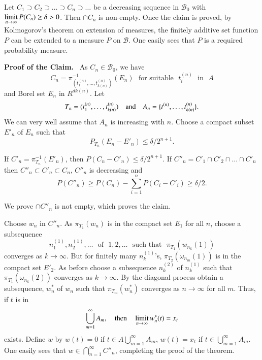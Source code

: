 \begin{claim*}
Let $C_{1}\supset C_{2}\supset \ldots \supset C_{n}\supset \ldots$ be
a decreasing sequence in $\mathscr{B}_{0}$ with $\operatorname*{limit}\limits_{n\to
  \infty}P(C_{n})\geq \delta>0$. Then $\cap C_{n}$ is non-empty. Once
the claim is proved, by Kolmogorov's theorem on extension of measures,
the finitely additive set function $P$ can be extended to a measure
$P$ on $\mathscr{B}$. One easily sees that $P$ is a required
probability measure.
\end{claim*}


\noindent
{\bf Proof of the Claim.}~ As $C_{n}\in \mathscr{B}_{0}$, we have 
$$
C_{n}=\pi^{-1}_{(t^{(n)}_{1},\ldots,t^{(n)}_{k(n)})}(E_{n})\text{~ for
  suitable~ } t^{(n)}_{i}\text{~ in~ } A
$$
and Borel set $E_{n}$ in $R^{dk(n)}$. Let
$$
T_{n}=(t^{(n)}_{1},\ldots,t^{(n)}_{k(n)})\quad\text{and}\quad
A_{n}=\{t^{(n)},\ldots,t^{(n)}_{k(n)}\}. 
$$
We can very well assume
that $A_{n}$ is increasing with\pageoriginale 
$n$. Choose a compact subset $E'_{n}$ of
$E_{n}$ such that 
$$
P_{T_{n}}(E_{n}-E'_{n})\leq \delta/2^{n+1}.
$$

If $C'_{n}=\pi^{-1}_{T_{n}}(E'_{n})$, then $P(C_{n}-C'_{n})\leq
\delta/2^{n+1}$. If $C''_{n}=C'_{1}\cap C'_{2}\cap \ldots\cap C'_{n}$
then $C''_{n}\subset C'_{n}\subset C_{n}$, $C''_{n}$ is decreasing and 
$$
P(C''_{n})\geq P(C_{n})-\sum\limits^{n}_{i=1}P(C_{i}-C'_{i})\geq \delta/2.
$$

We prove $\cap C''_{n}$ is not empty, which proves the claim.

Choose $w_{n}$ in $C''_{n}$. As $\pi_{T_{1}}(w_{n})$ is in the compact
set $E_{1}$ for all $n$, choose a subsequence
$$
n^{(1)}_{1}, n^{(1)}_{2},\ldots\text{~ of~ } 1,2,\ldots \text{~ such
  that~ } \pi_{T_{1}}(w_{n_{k}}(1))
$$
converges as $k\to \infty$. But for finitely many $n^{(1)}_{k}$'s,
$\pi_{T_{2}}(\omega_{n_{m}}(1))$ is in the compact set $E'_{2}$. As before
choose a subsequence $n^{(2)}_{k}$ of $n^{(1)}_{k}$ such that
$\pi_{T_{1}}(\omega_{n_{k}}(2))$ converges as $k\to \infty$. By the
diagonal process obtain a subsequence, $w^{*}_{n}$ of $w_{n}$ such
that $\pi_{T_{m}}(w^{*}_{n})$ converges as $n\to \infty$ for all
$m$. Thus, if $t$ is in
$$
\bigcup\limits^{\infty}_{m=1}A_{m},\quad\text{then}\quad \operatorname*{limit}\limits_{n\to \infty}w^{*}_{n}(t)=x_{t}
$$
exists. Define $w$ by $w(t)=0$ if $t\in
A\bigcup\limits^{\infty}_{m=1}A_{m}$, $w(t)=x_{t}$ if
$t\in\bigcup\limits^{\infty}_{m=1}A_{m}$. One easily sees that $w\in
\bigcap\limits^{\infty}_{n=1}C''_{n}$, completing the proof of the theorem.

